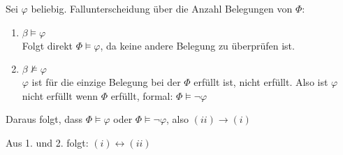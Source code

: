 \documentclass[a4paper,10pt]{article}
\begin{document}
\begin{enumerate}
 			Sei $\varphi$ beliebig. Fallunterscheidung über die Anzahl Belegungen von $\Phi$:
 			\begin{enumerate}
 				\item 	$\beta \vDash \varphi $ \\
 					Folgt direkt \(\Phi \vDash \varphi  \), da keine andere Belegung zu überprüfen ist. 
 				\item  	$\beta \not \vDash \varphi$ \\
 					$\varphi$ ist für die einzige Belegung bei der $\Phi$ erfüllt ist, nicht erfüllt. Also ist $\varphi$ nicht erfüllt wenn $\Phi$ erfüllt, formal: \(\Phi \vDash \lnot\varphi  \)
 			\end{enumerate}
 			Daraus folgt, dass $\Phi \vDash \varphi$ oder $\Phi \vDash \lnot \varphi$, also $(ii) \rightarrow (i)$		
 	\end{enumerate}
 	Aus 1. und 2. folgt: $(i) \leftrightarrow (ii)$
\end{document}
